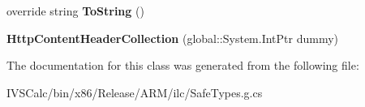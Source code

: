 \begin{DoxyCompactItemize}
\item 
\mbox{\label{class_windows_1_1_web_1_1_http_1_1_headers_1_1_http_content_header_collection_ac697d36819174461b46140496a676ebd}} 
override string {\bfseries To\+String} ()
\item 
\mbox{\label{class_windows_1_1_web_1_1_http_1_1_headers_1_1_http_content_header_collection_a475d4ca481e61a83edd097367e9b1629}} 
{\bfseries Http\+Content\+Header\+Collection} (global\+::\+System.\+Int\+Ptr dummy)
\end{DoxyCompactItemize}


The documentation for this class was generated from the following file\+:\begin{DoxyCompactItemize}
\item 
I\+V\+S\+Calc/bin/x86/\+Release/\+A\+R\+M/ilc/Safe\+Types.\+g.\+cs\end{DoxyCompactItemize}
